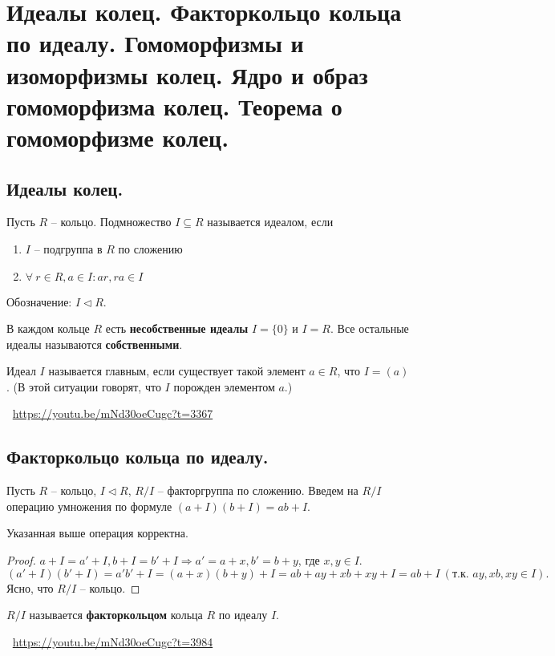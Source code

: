 \section{Идеалы колец. Факторкольцо кольца по идеалу. Гомоморфизмы и изоморфизмы колец. Ядро и образ гомоморфизма колец. Теорема о гомоморфизме колец.}

\subsection{Идеалы колец.}
\begin{definition}
    Пусть $R$ -- кольцо. Подмножество $I \subseteq R$ называется идеалом, если
    \begin{enumerate}
        \item $I$ -- подгруппа в $R$ по сложению
        \item $\forall \> r \in R, a \in I : ar, ra \in I$
    \end{enumerate}
    Обозначение: $I \triangleleft R$.
\end{definition}
В каждом кольце $R$ есть \textbf{несобственные идеалы} $I = \{0\}$ и $I = R$. Все остальные идеалы называются \textbf{собственными}.
\begin{definition}
    Идеал $I$ называется главным, если существует такой элемент $a \in R$, что $I = (a)$. (В этой ситуации говорят, что $I$ порожден элементом $a$.)
\end{definition}
\large \faYoutube \normalsize $\>$ \url{https://youtu.be/mNd30oeCugc?t=3367}

\subsection{Факторкольцо кольца по идеалу.}
Пусть $R$ -- кольцо, $I \triangleleft R$, $R / I$ -- факторгруппа по сложению. Введем на $R / I$ операцию умножения по формуле $(a + I)(b + I) = ab + I$.
\begin{statement}
    Указанная выше операция корректна.
    \begin{proof}
        $a + I = a' + I, b + I = b' + I \Rightarrow a' = a + x, b' = b + y$, где $x,y \in I$.
        \[
            (a' + I)(b' + I) = a'b' + I = (a + x)(b + y) + I = ab + ay + xb + xy + I = ab + I \> (\text{т.к. } ay, xb, xy \in I).
        \]
        Ясно, что $R / I$ -- кольцо.
    \end{proof}
\end{statement}
\begin{definition}
    $R / I$ называется \textbf{факторкольцом} кольца $R$ по идеалу $I$.
\end{definition}
\large \faYoutube \normalsize $\>$ \url{https://youtu.be/mNd30oeCugc?t=3984}

